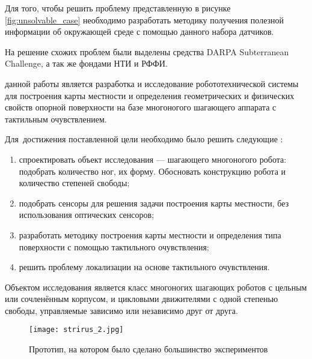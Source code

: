 Для того, чтобы решить проблему представленную в рисунке \ref{fig:unsolvable_case} необходимо разработать методику получения полезной информации об окружающей среде с помощью данного набора датчиков.

На решение схожих проблем были выделены средства DARPA Subterranean Challenge, а так же фондами НТИ и РФФИ.


{\aim} данной работы является разработка и исследование робототехнической системы для построения карты местности и определения геометрических и физических свойств опорной поверхности на базе многоногого шагающего аппарата с тактильным очувствлением.

Для~достижения поставленной цели необходимо было решить следующие {\tasks}:
\begin{enumerate}[beginpenalty=10000] %
  \item спроектировать объект исследования --- шагающего многоногого робота: подобрать количество ног, их форму. Обосновать конструкцию робота и количество степеней свободы;
  \item подобрать сенсоры для решения задачи построения карты местности, без использования оптических сенсоров;
  \item разработать методику построения карты местности и определения типа поверхности с помощью тактильного очувствления;
  \item решить проблему локализации на основе тактильного очувствления.
\end{enumerate}

{\researchobj}
Объектом исследования является класс многоногих шагающих роботов с цельным или сочленённым корпусом, и цикловыми движителями с одной степенью свободы, управляемые зависимо или независимо друг от друга.

\begin{figure}[H]
  \centering\texttt{[image: strirus\_2.jpg]}
  \caption{Прототип, на котором было сделано большинство экспериментов}
  \label{fig:strirus_2.jpgg}
\end{figure}

